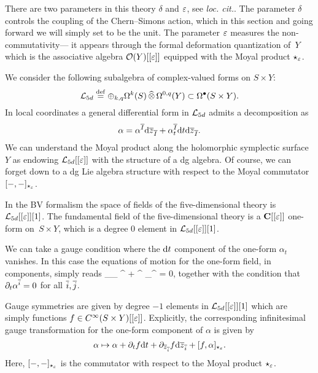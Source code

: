 There are two parameters in this theory $\delta$ and $\ep$, see \textit{loc. cit.}.
The parameter $\delta$ controls the coupling of the Chern--Simons action, which in this section and going forward we will simply set to be the unit. 
The parameter $\ep$ measures the non-commutativity---
it appears through the formal deformation quantization of~$Y$ which is the associative algebra $\cO(Y)[[\ep]]$ equipped with the Moyal product $\star_\ep$.

We consider the following subalgebra of complex-valued forms on $S\times Y$:
\[
\cL_{5d} \define \oplus_{k,q}\Omega^{k}(S)\hotimes \Omega^{0,q}(Y) \subset \Omega^\bu(S \times Y) .
\]
In local coordinates a general differential form in $\cL_{5d}$ admits a decomposition as
\[
\alpha = \alpha^{\Bar I} \d \zbar_{\Bar I} + \alpha^{\Bar I}_t \d t \d \zbar_{\Bar I} .
\]
We can understand the Moyal product along the holomorphic symplectic surface $Y$ as endowing $\cL_{5d}[[\ep]]$ with the structure of a dg algebra. 
Of course, we can forget down to a dg Lie algebra structure with respect to the Moyal commutator $[-,-]_{\star_{\ep}}$.

In the BV formalism the space of fields of the five-dimensional theory is $\cL_{5d}[[\ep]] [1]$. 
The fundamental field of the five-dimensional theory is a $\C[[\ep]]$ one-form on~$S \times Y$, which is a degree $0$ element in $\cL_{5d}[[\ep]] [1]$.

We can take a gauge condition where the $\d t$ component of the one-form $\alpha_t$ vanishes.
In this case the equations of motion for the one-form field, in components, simply reads
\beqn
\del_{\zbar_{}} \alpha^{} + \alpha^{} \star_\ep \alpha^{} = 0,
\eeqn
together with the condition that $\del_t \alpha^{\Bar{i}} = 0$ for all $\Bar{i}, \Bar{j}$.

%

Gauge symmetries are given by degree $-1$ elements in $\cL_{5d}[[\ep]][1]$ which are simply functions $f \in C^\infty (S\times Y)[[\ep]]$. 
Explicitly, the corresponding infinitesimal gauge transformation for the one-form component of $\alpha$ is given by
\[
\alpha \mapsto \alpha + \del_t f \d t +\del_{\zbar_{\Bar{i}}} f \d \zbar_{\Bar{i}} + [f, \alpha]_{\star_\ep} .
\]
Here, $[-,-]_{\star_{\ep}}$ is the commutator with respect to the Moyal product $\star_\ep$. 

